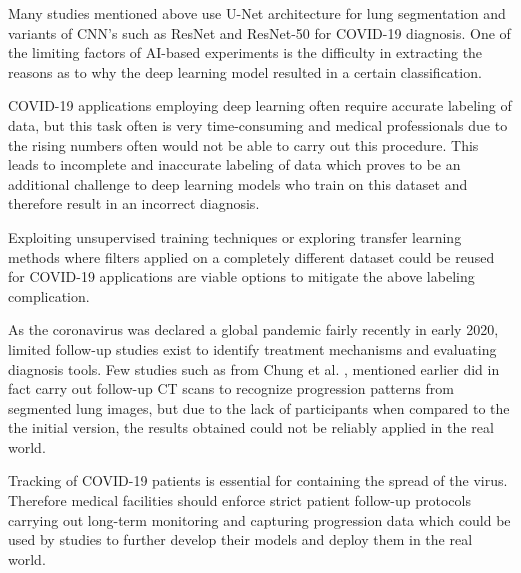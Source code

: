 Many studies mentioned above use U-Net architecture for lung segmentation and variants of CNN's such as ResNet and ResNet-50 for COVID-19 diagnosis. One of the limiting factors of AI-based experiments is the difficulty in extracting the reasons as to why the deep learning model resulted in a certain classification. 

COVID-19 applications employing deep learning often require accurate 
labeling of data, but this task often is very time-consuming and medical 
professionals due to the rising numbers often would not be able to carry out 
this procedure. This leads to incomplete and inaccurate labeling of data which 
proves to be an additional challenge to deep learning models who train on this 
dataset and therefore result in an incorrect diagnosis.

Exploiting unsupervised training techniques \cite{NVF+2018, DGE2015} or exploring transfer learning methods \cite{TFK+2018}
where filters applied on a completely different dataset could be 
reused for COVID-19 applications are viable options to mitigate the above labeling 
complication.

As the coronavirus was declared a global pandemic fairly recently in early 2020, limited 
follow-up studies exist to identify treatment mechanisms and 
evaluating diagnosis tools. Few studies such as from Chung et al. \cite{CMA+2020}, mentioned earlier 
did in fact carry out follow-up CT scans to recognize progression patterns from 
segmented lung images, but due to the lack of participants when compared to the 
the initial version, the results obtained could not be reliably applied in the real world.


Tracking of COVID-19 patients is essential for containing 
the spread of the virus. Therefore medical facilities should enforce 
strict patient follow-up protocols carrying out long-term monitoring and capturing 
progression data which could be used by studies to further develop their models 
and deploy them in the real world. 

